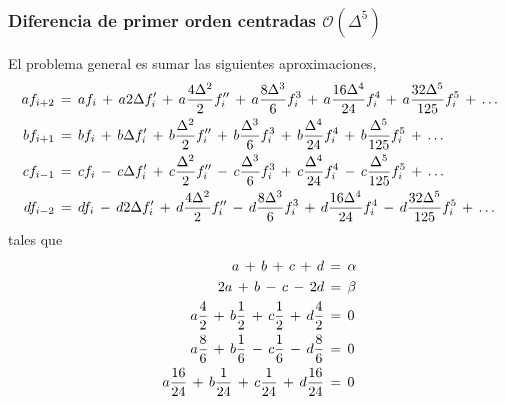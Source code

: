\documentclass[9pt,technote,twoside,letterpaper,onecolumn]{IEEEtran}
\begin{document}
\subsubsection{Diferencia de primer orden centradas $\mathcal{O}(\Delta^5)$}
\label{sec:dif1D2Od}
El problema general es sumar las siguientes aproximaciones,
{\tiny
  \begin{align}
    af_{i+2}&\,=\,af_i
              \,+\,a2\Delta f'_i
              \,+\,a\frac{4\Delta^2}{2}f''_i
              \,+\,a\frac{8\Delta^3}{6}f^3_i
              \,+\,a\frac{16\Delta^4}{24}f^4_i
              \,+\,a\frac{32\Delta^5}{125}f^5_i  
              \,+\,\ldots  
              \notag\\
    bf_{i+1}&\,=\,bf_i
              \,+\,b\Delta f'_i
              \,+\,b\frac{\Delta^2}{2}f''_i
              \,+\,b\frac{\Delta^3}{6}f^3_i
              \,+\,b\frac{\Delta^4}{24}f^4_i
              \,+\,b\frac{\Delta^5}{125}f^5_i  
              \,+\,\ldots  
              \notag\\
    cf_{i-1}&\,=\,cf_i
               \,-\,c\Delta f'_i
               \,+\,c\frac{\Delta^2}{2}f''_i
               \,-\,c\frac{\Delta^3}{6}f^3_i
               \,+\,c\frac{\Delta^4}{24}f^4_i
               \,-\,c\frac{\Delta^5}{125}f^5_i  
               \,+\,\ldots  
               \notag\\
    df_{i-2}&\,=\,df_i
             \,-\,d2\Delta f'_i
             \,+\,d\frac{4\Delta^2}{2}f''_i
             \,-\,d\frac{8\Delta^3}{6}f^3_i
             \,+\,d\frac{16\Delta^4}{24}f^4_i
             \,-\,d\frac{32\Delta^5}{125}f^5_i  
             \,+\,\ldots
             \notag
  \end{align}
}
tales que
{%
  \begin{align}
    a
    \,+\,b
    \,+\,c
    \,+\,d
    &\,=\,\alpha \notag\\
    2a
    \,+\, b
    \,-\, c
    \,-\,2d
    &\,=\,\beta \notag\\
    a\frac{4}{2}
    \,+\,b\frac{1}{2}
    \,+\,c\frac{1}{2}
    \,+\,d\frac{4}{2}
                         &\,=\,0 \notag\\
    a\frac{8}{6}
    \,+\,b\frac{1}{6}
    \,-\,c\frac{1}{6}
    \,-\,d\frac{8}{6}
                         &\,=\,0 \notag\\  
    a\frac{16}{24}
    \,+\,b\frac{1}{24}
    \,+\,c\frac{1}{24}
    \,+\,d\frac{16}{24}
                         &\,=\,0 \notag
  \end{align}
}
\end{document}
